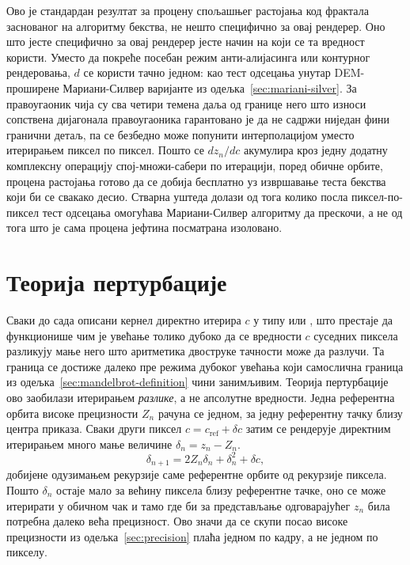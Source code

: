 \documentclass[serbian]{ftndiplomski}
\begin{document}
Ово је стандардан резултат за процену спољашњег растојања код фрактала заснованог на
алгоритму бекства, не нешто специфично за овај рендерер. Оно што јесте специфично за
овај рендерер јесте начин на који се та вредност користи. Уместо да покреће посебан
режим анти-алијасинга или контурног рендеровања, $d$ се користи тачно једном: као
тест одсецања унутар DEM-проширене Мариани-Силвер варијанте из
одељка~\ref{sec:mariani-silver}. За правоугаоник чија су сва четири темена даља од
границе него што износи сопствена дијагонала правоугаоника гарантовано је да не садржи
ниједан фини гранични детаљ, па се безбедно може попунити интерполацијом уместо
итерирањем пиксел по пиксел. Пошто се $dz_n/dc$ акумулира кроз једну додатну
комплексну операцију спој-множи-сабери по итерацији, поред обичне орбите, процена
растојања готово да се добија бесплатно уз извршавање теста бекства који би се
свакако десио. Стварна уштеда долази од тога колико посла пиксел-по-пиксел тест
одсецања омогућава Мариани-Силвер алгоритму да прескочи, а не од тога што је сама
процена јефтина посматрана изоловано.

\section{Теорија пертурбације}
\label{sec:perturbation}

Сваки до сада описани кернел директно итерира $c$ у типу  или , што
престаје да функционише чим је увећање толико дубоко да се вредности $c$ суседних
пиксела разликују мање него што аритметика двоструке тачности може да разлучи. Та
граница се достиже далеко пре режима дубоког увећања који самослична граница из
одељка~\ref{sec:mandelbrot-definition} чини занимљивим. Теорија пертурбације
\cite{martin2013superfractalthing} ово заобилази итерирањем \emph{разлике}, а не
апсолутне вредности. Једна референтна орбита високе прецизности $Z_n$ рачуна се
једном, за једну референтну тачку близу центра приказа. Сваки други пиксел $c =
c_{\mathrm{ref}} + \delta c$ затим се рендерује директним итерирањем много мање
величине $\delta_n = z_n - Z_n$.
\begin{equation}
  \label{eq:perturbation}
  \delta_{n+1} = 2 Z_n \delta_n + \delta_n^2 + \delta c ,
\end{equation}
добијене одузимањем рекурзије саме референтне орбите од рекурзије пиксела. Пошто
$\delta_n$ остаје мало за већину пиксела близу референтне тачке, оно се може итерирати
у обичном  чак и тамо где би за представљање одговарајућег $z_n$ била
потребна далеко већа прецизност. Ово значи да се скупи посао високе прецизности из
одељка~\ref{sec:precision} плаћа једном по кадру, а не једном по пикселу.
\end{document}
